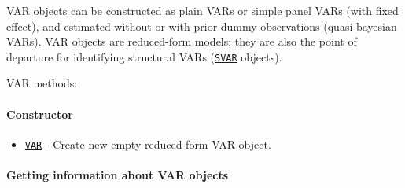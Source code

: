 

	VAR objects can be constructed as plain VARs or simple panel VARs (with
fixed effect), and estimated without or with prior dummy observations
(quasi-bayesian VARs). VAR objects are reduced-form models; they are
also the point of departure for identifying structural VARs
(\href{SVAR/Contents}{\texttt{SVAR}} objects).

VAR methods:

\paragraph{Constructor}\label{constructor}

\begin{itemize}
\itemsep1pt\parskip0pt
\item
  \href{VAR/VAR}{\texttt{VAR}} - Create new empty reduced-form VAR
  object.
\end{itemize}

\paragraph{Getting information about VAR
objects}\label{getting-information-about-var-objects}

